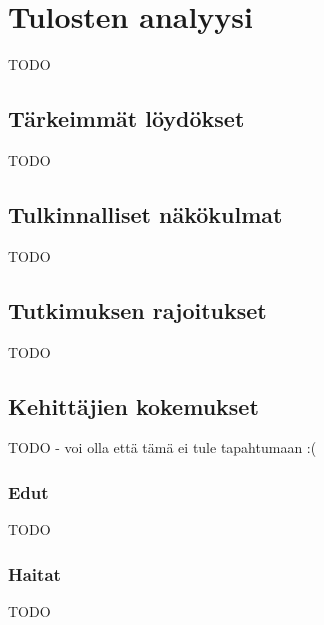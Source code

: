 \vspace{21.5pt}
\chapter{Tulosten analyysi}
TODO

\section{Tärkeimmät löydökset}

TODO

\section{Tulkinnalliset näkökulmat}

TODO

\section{Tutkimuksen rajoitukset}

TODO

\section{Kehittäjien kokemukset}

TODO - voi olla että tämä ei tule tapahtumaan :(

\subsection{Edut}

TODO

\subsection{Haitat}

TODO
